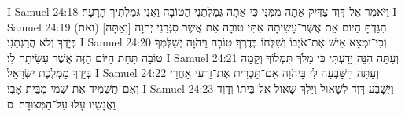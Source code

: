 I Samuel 24:18	וַיֹּאמֶר אֶל־דָּוִד צַדִּיק אַתָּה מִמֶּנִּי כִּי אַתָּה גְּמַלְתַּנִי הַטּוֹבָה וַאֲנִי גְּמַלְתִּיךָ הָרָעָה׃
I Samuel 24:19	(ואת) [וְאַתָּה] הִגַּדְתָּ הַיּוֹם אֵת אֲשֶׁר־עָשִׂיתָה אִתִּי טוֹבָה אֵת אֲשֶׁר סִגְּרַנִי יְהֹוָה בְּיָדְךָ וְלֹא הֲרַגְתָּנִי׃
I Samuel 24:20	וְכִי־יִמְצָא אִישׁ אֶת־אֹיְבוֹ וְשִׁלְּחוֹ בְּדֶרֶךְ טוֹבָה וַיהֹוָה יְשַׁלֶּמְךָ טוֹבָה תַּחַת הַיּוֹם הַזֶּה אֲשֶׁר עָשִׂיתָה לִי׃
I Samuel 24:21	וְעַתָּה הִנֵּה יָדַעְתִּי כִּי מָלֹךְ תִּמְלוֹךְ וְקָמָה בְּיָדְךָ מַמְלֶכֶת יִשְׂרָאֵל׃
I Samuel 24:22	וְעַתָּה הִשָּׁבְעָה לִּי בַּיהֹוָה אִם־תַּכְרִית אֶת־זַרְעִי אַחֲרָי וְאִם־תַּשְׁמִיד אֶת־שְׁמִי מִבֵּית אָבִי׃
I Samuel 24:23	וַיִּשָּׁבַע דָּוִד לְשָׁאוּל וַיֵּלֶךְ שָׁאוּל אֶל־בֵּיתוֹ וְדָוִד וַאֲנָשָׁיו עָלוּ עַל־הַמְּצוּדָה׃ {ס}        
